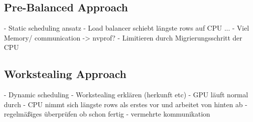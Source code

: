 \subsection{Pre-Balanced Approach}
- Static scheduling ansatz
- Load balancer schiebt längste rows auf CPU
...
- Viel Memory/ communication -> nvprof?
- Limitieren durch Migrierungsschritt der CPU

\subsection{Workstealing Approach}
- Dynamic scheduling
- Workstealing erklären (herkunft etc)
- GPU läuft normal durch
- CPU nimmt sich längste rows als erstes vor und arbeitet von hinten ab
- regelmäßiges überprüfen ob schon fertig
- vermehrte kommunikation